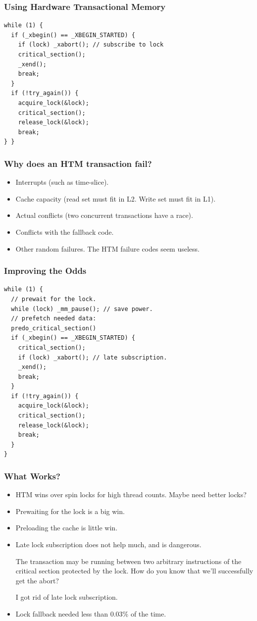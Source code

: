 \documentclass[xcolor=dvipsnames,14pt]{beamer}
\newcommand{\smmpunt}[1]{#1}
\begin{document}
\smmpunt{}
\begin{frame}[fragile]
\frametitle{Using Hardware Transactional Memory}

\begin{verbatim}
while (1) {
  if (_xbegin() == _XBEGIN_STARTED) {
    if (lock) _xabort(); // subscribe to lock
    critical_section();
    _xend();
    break;
  }
  if (!try_again()) {
    acquire_lock(&lock);
    critical_section();
    release_lock(&lock);
    break;
} }
\end{verbatim}
\end{frame}
{}

\smmpunt{
\begin{frame}
\frametitle{Why does an HTM transaction fail?}
\begin{itemize}
\item Interrupts (such as time-slice).
\item Cache capacity (read set must fit in L2.  Write set must fit in L1).
\item Actual conflicts (two concurrent transactions have a race).
\item Conflicts with the fallback code.
\item Other random failures.  The HTM failure codes seem useless.
\end{itemize}

\end{frame}
}

\smmpunt{}
\begin{frame}[fragile]
\frametitle{Improving the Odds}

\begin{verbatim}
while (1) {
  // prewait for the lock.
  while (lock) _mm_pause(); // save power.
  // prefetch needed data:
  predo_critical_section()
  if (_xbegin() == _XBEGIN_STARTED) {
    critical_section();
    if (lock) _xabort(); // late subscription.
    _xend();
    break;
  }
  if (!try_again()) {
    acquire_lock(&lock);
    critical_section();
    release_lock(&lock);
    break;
  }
}
\end{verbatim}
\end{frame}
{}

\smmpunt{
\begin{frame}
\frametitle{What Works?}

\begin{itemize}
\item HTM wins over spin locks for high thread counts.  Maybe need better locks?
\item Prewaiting for the lock is a big win.
\item Preloading the cache is little win.
\item Late lock subscription does not help much, and is dangerous.  

The transaction may be running between two arbitrary instructions of
the critical section protected by the lock.  How do you know that
we'll successfully get the abort?

I got rid of late lock subscription.
\item Lock fallback needed less than 0.03\% of the time.
\end{itemize}
\end{frame}
}
\end{document}

